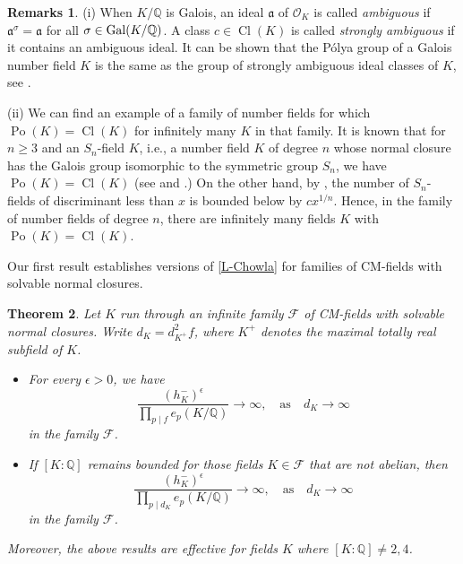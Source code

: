 \documentclass[12pt]{amsart}
\newtheorem{theorem}{Theorem}[section]
\theoremstyle{definition}
\newtheorem{notes}[theorem]{Remarks}
\numberwithin{equation}{section}
\DeclareMathOperator{\Po}{Po}
\DeclareMathOperator{\Cl}{Cl}
\begin{document}
{\begin{notes}
(i) When $K/\mathbb{Q}$ is Galois, an ideal $\mathfrak{a}$ of $\mathcal{O}_K$ is called \emph{ambiguous} if $\mathfrak{a}^\sigma=\mathfrak{a}$ for all $\sigma\in {\rm Gal}(K/\mathbb{Q})$. A class $c\in \Cl(K)$ is called \emph{strongly ambiguous} 
if it contains an ambiguous ideal. It can be shown that the P\'{o}lya group of a Galois number field $K$ is the same as the group of strongly ambiguous ideal classes of $K$, see \cite[p. 10]{Zantema}.


(ii) We can find an example of a family of number fields for which $\Po(K)=\Cl(K)$ for infinitely many $K$ in that family. It is known that for $n \geq 3$ and an $S_n$-field $K$, 
i.e., a number field $K$ of degree $n$ whose normal closure has the Galois group isomorphic to the symmetric group $S_n$, we have $\Po(K)=\Cl(K)$ (see \cite[Theorem 4.1]{ChabertII} and \cite[Theorem 3.10]{Abbas}.) On the other hand, by \cite[Proposition 6.2]{Malle}, the number of $S_n$-fields of discriminant less than $x$ is bounded below by $cx^{1/n}$. Hence, in the family of number fields of degree $n$, there are infinitely many fields $K$ with $\Po(K)=\Cl(K)$.
\end{notes}
}

Our first result establishes versions of \eqref{L-Chowla} for families of CM-fields with solvable normal closures.


\begin{theorem} 
\label{theorem,CM}
Let $K$ run through an  {infinite} family $\mathcal{F}$ of CM-fields with solvable normal closures.
Write $d_K=d_{K^+}^2f$, where $K^+$ denotes the maximal totally real subfield of $K$.
\begin{itemize}
\item[(i)]  For every $\epsilon >0$, we have
\begin{equation*}
	\frac{(h_K^-)^{\epsilon}}{\prod_{p \mid f}e_p(K/\mathbb{Q})} \rightarrow \infty,  \quad \text{as} \quad d_K \rightarrow \infty	
\end{equation*}
in the family $\mathcal{F}$.
\item[(ii)] If $[K:\mathbb{Q}]$ remains bounded for those fields $K \in \mathcal{F}$ that are not abelian, then
\begin{equation*}
	\frac{(h_K^-)^{\epsilon}}{\prod_{p \mid d_K}e_p(K/\mathbb{Q})} \rightarrow \infty,  \quad \text{as} \quad d_K \rightarrow \infty
\end{equation*} 
in the family $\mathcal{F}$. 
\end{itemize}

\noindent
Moreover, the above results are effective for fields $K$ where $[K:\mathbb{Q}]\neq 2, 4$.
\end{theorem}
\end{document}
